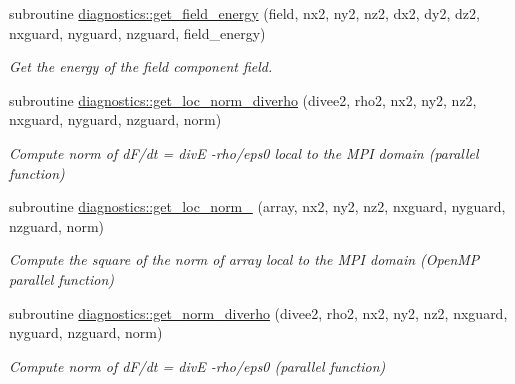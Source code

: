 \begin{DoxyCompactItemize}
\item 
subroutine \hyperlink{namespacediagnostics_ac039b5b8f68cf780a761ee735024fe56}{diagnostics\+::get\+\_\+field\+\_\+energy} (field, nx2, ny2, nz2, dx2, dy2, dz2, nxguard, nyguard, nzguard, field\+\_\+energy)
\begin{DoxyCompactList}\small\item\em Get the energy of the field component field. \end{DoxyCompactList}\item 
subroutine \hyperlink{namespacediagnostics_a0c81a0eb062f6137922f5a857c51e684}{diagnostics\+::get\+\_\+loc\+\_\+norm\+\_\+diverho} (divee2, rho2, nx2, ny2, nz2, nxguard, nyguard, nzguard, norm)
\begin{DoxyCompactList}\small\item\em Compute norm of d\+F/dt = divE -\/rho/eps0 local to the M\+PI domain (parallel function) \end{DoxyCompactList}\item 
subroutine \hyperlink{namespacediagnostics_a64b59a6d54ed382f0cdfc360a5ccea39}{diagnostics\+::get\+\_\+loc\+\_\+norm\+\_} (array, nx2, ny2, nz2, nxguard, nyguard, nzguard, norm)
\begin{DoxyCompactList}\small\item\em Compute the square of the norm of array local to the M\+PI domain (Open\+MP parallel function) \end{DoxyCompactList}\item 
subroutine \hyperlink{namespacediagnostics_a39c7463e667e97124ccb0c85381e6d03}{diagnostics\+::get\+\_\+norm\+\_\+diverho} (divee2, rho2, nx2, ny2, nz2, nxguard, nyguard, nzguard, norm)
\begin{DoxyCompactList}\small\item\em Compute norm of d\+F/dt = divE -\/rho/eps0 (parallel function) \end{DoxyCompactList}\end{DoxyCompactItemize}
